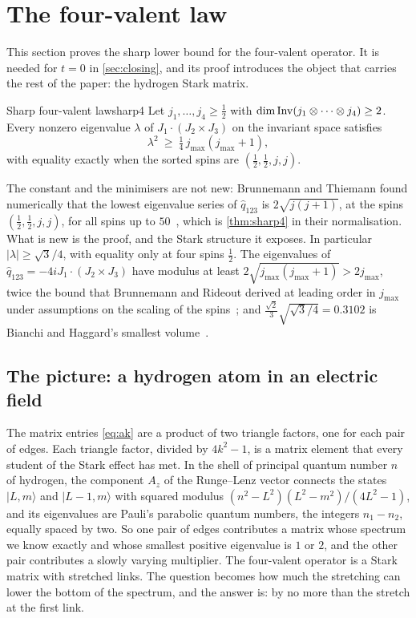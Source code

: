 \section{The four-valent law}\label{sec:fourvalent}

This section proves the sharp lower bound for the four-valent operator. It is
needed for $t=0$ in \cref{sec:closing}, and its proof introduces the object that
carries the rest of the paper: the hydrogen Stark matrix.

\begin{theorem}{Sharp four-valent law}{sharp4}
Let $j_1,\dots,j_4\ge\frac12$ with $\dim\operatorname{Inv}(j_1\otimes\cdots\otimes j_4)\ge2$.
Every nonzero eigenvalue $\lambda$ of $J_1\cdot(J_2\times J_3)$ on the invariant space
satisfies
\[
  \lambda^2\ \ge\ \tfrac14\,j_{\max}(j_{\max}+1),
\]
with equality exactly when the sorted spins are $(\frac12,\frac12,j,j)$.
\end{theorem}

The constant and the minimisers are not new: Brunnemann and Thiemann found
numerically that the lowest eigenvalue series of $\hat q_{123}$ is $2\sqrt{j(j+1)}$, at
the spins $(\frac12,\frac12,j,j)$, for all spins up to $50$~\cite[table on
p.~38]{BT2006}, which is \cref{thm:sharp4} in their normalisation. What is new is the
proof, and the Stark structure it exposes. In particular $|\lambda|\ge\sqrt3/4$, with equality only at four spins $\frac12$.
The eigenvalues of $\hat q_{123}=-4iJ_1\cdot(J_2\times J_3)$ have modulus at least
$2\sqrt{j_{\max}(j_{\max}+1)}>2j_{\max}$, twice the bound that Brunnemann and Rideout
derived at leading order in $j_{\max}$ under assumptions on the scaling of the
spins~\cite[(7.56)]{BR2008b};
and
$\frac{\sqrt2}3\sqrt{\sqrt3/4}=0.3102$ is Bianchi and Haggard's smallest
volume~\cite{BH2011}.

\subsection{The picture: a hydrogen atom in an electric field}

The matrix entries \eqref{eq:ak} are a product of two triangle factors, one for each
pair of edges. Each triangle factor, divided by $4k^2-1$, is a matrix element that
every student of the Stark effect has met. In the shell of principal quantum number
$n$ of hydrogen, the component $A_z$ of the Runge--Lenz vector connects the states
$|L,m\rangle$ and $|L-1,m\rangle$ with squared modulus
$(n^2-L^2)(L^2-m^2)/(4L^2-1)$, and its eigenvalues are Pauli's parabolic quantum
numbers, the integers $n_1-n_2$, equally spaced by two. So one pair of edges
contributes a matrix whose spectrum we know exactly and whose smallest positive
eigenvalue is $1$ or $2$, and the other pair contributes a slowly varying
multiplier. The four-valent operator is a Stark matrix with stretched links. The
question becomes how much the stretching can lower the bottom of the spectrum, and
the answer is: by no more than the stretch at the first link.

